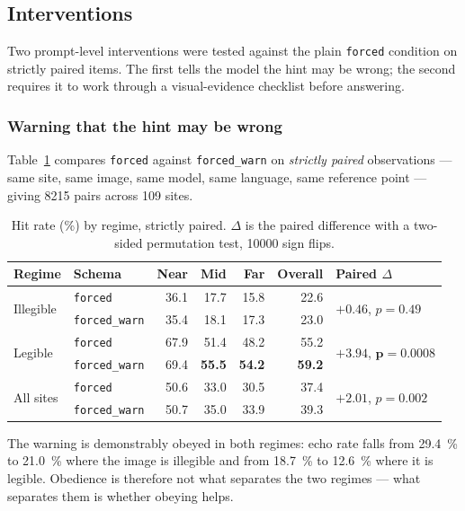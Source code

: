 \documentclass[10pt,a4paper]{article}
\begin{document}
\subsection{Interventions}
\label{sec:interventions}

Two prompt-level interventions were tested against the plain \texttt{forced}
condition on strictly paired items. The first tells the model the hint may be
wrong; the second requires it to work through a visual-evidence checklist before
answering.

\subsubsection{Warning that the hint may be wrong}
\label{sec:mitigation}

Table~\ref{tab:mitigation} compares \texttt{forced} against
\texttt{forced\_warn} on \emph{strictly paired} observations --- same site, same
image, same model, same language, same reference point --- giving \num{8215}
pairs across \num{109} sites.

\begin{table}[!htbp]
\centering
\caption{Hit rate (\si{\percent}) by regime, strictly paired. $\Delta$ is the
paired difference with a two-sided permutation test, \num{10000} sign flips.}
\label{tab:mitigation}
\begin{tabular}{llrrrrl}
\toprule
Regime & Schema & Near & Mid & Far & Overall & Paired $\Delta$ \\
\midrule
\multirow{2}{*}{Illegible}
 & \texttt{forced}       & 36.1 & 17.7 & 15.8 & 22.6 & \multirow{2}{*}{$+0.46$, $p=\num{0.49}$} \\
 & \texttt{forced\_warn} & 35.4 & 18.1 & 17.3 & 23.0 & \\
\midrule
\multirow{2}{*}{Legible}
 & \texttt{forced}       & 67.9 & 51.4 & 48.2 & 55.2 & \multirow{2}{*}{$\mathbf{+3.94}$, $\mathbf{p=\num{0.0008}}$} \\
 & \texttt{forced\_warn} & 69.4 & \textbf{55.5} & \textbf{54.2} & \textbf{59.2} & \\
\midrule
\multirow{2}{*}{All sites}
 & \texttt{forced}       & 50.6 & 33.0 & 30.5 & 37.4 & \multirow{2}{*}{$+2.01$, $p=\num{0.002}$} \\
 & \texttt{forced\_warn} & 50.7 & 35.0 & 33.9 & 39.3 & \\
\bottomrule
\end{tabular}
\end{table}

The warning is demonstrably obeyed in both regimes: echo rate falls from
\SI{29.4}{\percent} to \SI{21.0}{\percent} where the image is illegible and from
\SI{18.7}{\percent} to \SI{12.6}{\percent} where it is legible. Obedience is
therefore not what separates the two regimes --- what separates them is whether
obeying helps.
\end{document}
